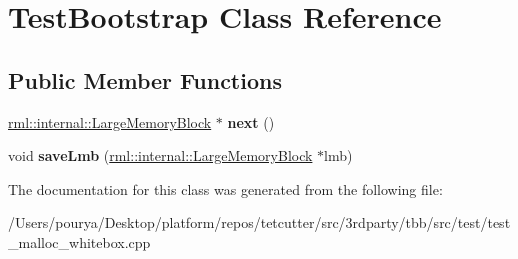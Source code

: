 \hypertarget{classTestBootstrap}{}\section{Test\+Bootstrap Class Reference}
\label{classTestBootstrap}
\subsection*{Public Member Functions}
\begin{DoxyCompactItemize}
\item 
\hypertarget{classTestBootstrap_ab95a556dbad2c94c5db01fd3d8038f45}{}\hyperlink{structrml_1_1internal_1_1LargeMemoryBlock}{rml\+::internal\+::\+Large\+Memory\+Block} $\ast$ {\bfseries next} ()\label{classTestBootstrap_ab95a556dbad2c94c5db01fd3d8038f45}

\item 
\hypertarget{classTestBootstrap_a84679fad007735d83109b2170b6b0ebf}{}void {\bfseries save\+Lmb} (\hyperlink{structrml_1_1internal_1_1LargeMemoryBlock}{rml\+::internal\+::\+Large\+Memory\+Block} $\ast$lmb)\label{classTestBootstrap_a84679fad007735d83109b2170b6b0ebf}

\end{DoxyCompactItemize}


The documentation for this class was generated from the following file\+:\begin{DoxyCompactItemize}
\item 
/\+Users/pourya/\+Desktop/platform/repos/tetcutter/src/3rdparty/tbb/src/test/test\+\_\+malloc\+\_\+whitebox.\+cpp\end{DoxyCompactItemize}
